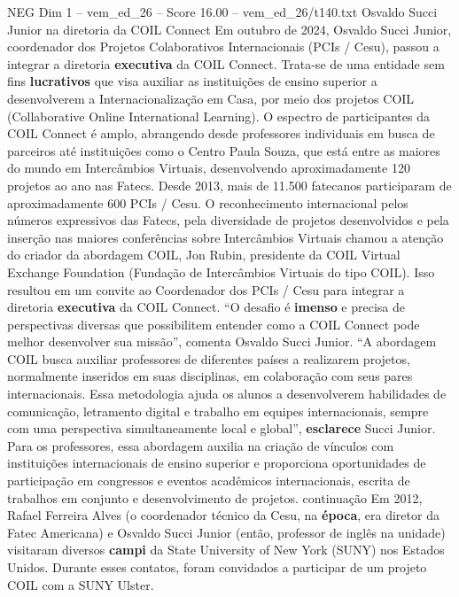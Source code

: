 \begin{textsample}{NEG Dim 1 – vem\_ed\_26 – Score 16.00 – vem\_ed\_26/t140.txt}  \label{ex:f1_neg_129}
Osvaldo Succi Junior na diretoria da COIL Connect Em outubro de 2024, Osvaldo Succi Junior, coordenador dos Projetos Colaborativos Internacionais (PCIs / Cesu), passou a integrar a diretoria \textbf{executiva} da COIL Connect.
Trata-se de uma entidade sem fins \textbf{lucrativos} que visa auxiliar as instituições de ensino superior a desenvolverem a Internacionalização em Casa, por meio dos projetos COIL (Collaborative Online International Learning).
O espectro de participantes da COIL Connect é amplo, abrangendo desde professores individuais em busca de parceiros até instituições como o Centro Paula Souza, que está entre as maiores do mundo em Intercâmbios Virtuais, desenvolvendo aproximadamente 120 projetos ao ano nas Fatecs.
Desde 2013, mais de 11.500 fatecanos participaram de aproximadamente 600 PCIs / Cesu.
O reconhecimento internacional pelos números expressivos das Fatecs, pela diversidade de projetos desenvolvidos e pela inserção nas maiores conferências sobre Intercâmbios Virtuais chamou a atenção do criador da abordagem COIL, Jon Rubin, presidente da COIL Virtual Exchange Foundation (Fundação de Intercâmbios Virtuais do tipo COIL).
Isso resultou em um convite ao Coordenador dos PCIs / Cesu para integrar a diretoria \textbf{executiva} da COIL Connect. “O desafio é \textbf{imenso} e precisa de perspectivas diversas que possibilitem entender como a COIL Connect pode melhor desenvolver sua missão”, comenta Osvaldo Succi Junior. “A abordagem COIL busca auxiliar professores de diferentes países a realizarem projetos, normalmente inseridos em suas disciplinas, em colaboração com seus pares internacionais.
Essa metodologia ajuda os alunos a desenvolverem habilidades de comunicação, letramento digital e trabalho em equipes internacionais, sempre com uma perspectiva simultaneamente local e global”, \textbf{esclarece} Succi Junior.
Para os professores, essa abordagem auxilia na criação de vínculos com instituições internacionais de ensino superior e proporciona oportunidades de participação em congressos e eventos acadêmicos internacionais, escrita de trabalhos em conjunto e desenvolvimento de projetos. continuação Em 2012, Rafael Ferreira Alves (o coordenador técnico da Cesu, na \textbf{época}, era diretor da Fatec Americana) e Osvaldo Succi Junior (então, professor de inglês na unidade) visitaram diversos \textbf{campi} da State University of New York (SUNY) nos Estados Unidos.
Durante esses contatos, foram convidados a participar de um projeto COIL com a SUNY Ulster.

\end{textsample}
